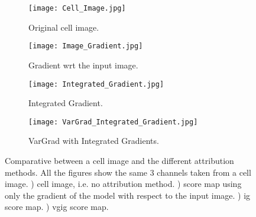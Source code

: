 \begin{figure}[htb]
  \centering
  \begin{subfigure}[b]{.45\linewidth}
    \texttt{[image: Cell\_Image.jpg]}
    \caption{Original cell image.}
    \label{fig:vg:cell_img}
  \end{subfigure}
  \begin{subfigure}[b]{.45\linewidth}
    \texttt{[image: Image\_Gradient.jpg]}
    \caption{Gradient wrt the input image.}
    \label{fig:vg:img_gradients}
  \end{subfigure}%
  \vspace{3mm}
  \begin{subfigure}[b]{.45\linewidth}
    \texttt{[image: Integrated\_Gradient.jpg]}
    \caption{Integrated Gradient.}
    \label{fig:vg:img_IG}
  \end{subfigure}
  \begin{subfigure}[b]{.45\linewidth}
    \texttt{[image: VarGrad\_Integrated\_Gradient.jpg]}
    \caption{VarGrad with Integrated Gradients.}
    \label{fig:vg:img_VG_IG}
  \end{subfigure}
  \caption{Comparative between a cell image and the different attribution methods. All the figures show the same 3 channels taken from a cell image. ) cell image, i.e. no attribution method. ) score map using only the gradient of the model with respect to the input image. ) \acrlong{ig} score map. ) \acrlong{vgig} score map.}
  \label{fig:vg:comparative}
\end{figure}
